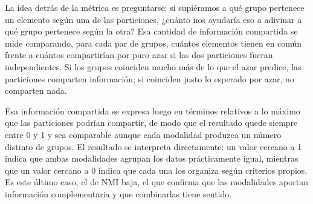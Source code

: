 La idea detrás de la métrica es preguntarse: si supiéramos a qué grupo pertenece un elemento según una de las particiones, ¿cuánto nos ayudaría eso a adivinar a qué grupo pertenece según la otra? Esa cantidad de información compartida se mide comparando, para cada par de grupos, cuántos elementos tienen en común frente a cuántos compartirían por puro azar si las dos particiones fueran independientes. Si los grupos coinciden mucho más de lo que el azar predice, las particiones comparten información; si coinciden justo lo esperado por azar, no comparten nada.

Esa información compartida se expresa luego en términos relativos a lo máximo que las particiones podrían compartir, de modo que el resultado quede siempre entre 0 y 1 y sea comparable aunque cada modalidad produzca un número distinto de grupos. El resultado se interpreta directamente: un valor cercano a 1 indica que ambas modalidades agrupan los datos prácticamente igual, mientras que un valor cercano a 0 indica que cada una los organiza según criterios propios. Es este último caso, el de NMI baja, el que confirma que las modalidades aportan información complementaria y que combinarlas tiene sentido.
